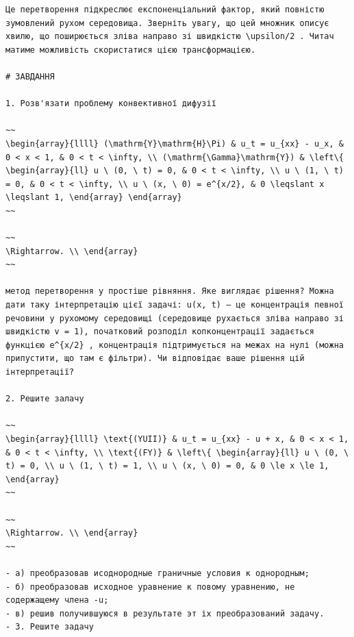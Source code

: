 \documentclass[
  ukrainian,
]{article}
\begin{document}
\begin{verbatim}
Це перетворення підкреслює експоненціальний фактор, який повністю зумовлений рухом середовища. Зверніть увагу, що цей множник описує хвилю, що поширюється зліва направо зі швидкістю \upsilon/2 . Читач матиме можливість скористатися цією трансформацією.

# ЗАВДАННЯ

1. Розв'язати проблему конвективної дифузії

~~
\begin{array}{llll} (\mathrm{Y}\mathrm{H}\Pi) & u_t = u_{xx} - u_x, & 0 < x < 1, & 0 < t < \infty, \\ (\mathrm{\Gamma}\mathrm{Y}) & \left\{ \begin{array}{ll} u \ (0, \ t) = 0, & 0 < t < \infty, \\ u \ (1, \ t) = 0, & 0 < t < \infty, \\ u \ (x, \ 0) = e^{x/2}, & 0 \leqslant x \leqslant 1, \end{array} \end{array}
~~

~~
\Rightarrow. \\ \end{array}
~~

метод перетворення у простіше рівняння. Яке виглядає рішення? Можна дати таку інтерпретацію цієї задачі: u(x, t) — це концентрація певної речовини у рухомому середовищі (середовище рухається зліва направо зі швидкістю v = 1), початковий розподіл копконцентрації задається функцією e^{x/2} , концентрація підтримується на межах на нулі (можна припустити, що там є фільтри). Чи відповідає ваше рішення цій інтерпретації?

2. Решите залачу

~~
\begin{array}{llll} \text{(YUII)} & u_t = u_{xx} - u + x, & 0 < x < 1, & 0 < t < \infty, \\ \text{(FY)} & \left\{ \begin{array}{ll} u \ (0, \ t) = 0, \\ u \ (1, \ t) = 1, \\ u \ (x, \ 0) = 0, & 0 \le x \le 1, \end{array}
~~

~~
\Rightarrow. \\ \end{array}
~~

- а) преобразовав исоднородные граничные условия к однородным;
- б) преобразовав исходное уравнение к повому уравнению, не содержащему члена -u;
- в) решив получившуюся в результате эт іх преобразований задачу.
- 3. Решите задачу
\end{verbatim}
\end{document}
